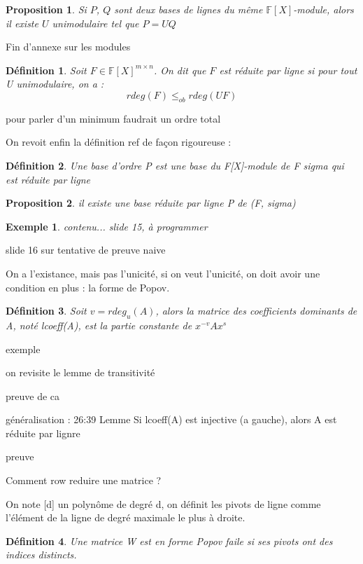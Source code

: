 \documentclass[a4paper,12pt]{report}  %
\theoremstyle{definitionstyle}
\newtheorem{definition}{Définition}[chapter] %
\theoremstyle{examplestyle}
\newtheorem{example}{Exemple}[chapter] %
\theoremstyle{remarkstyle}
\theoremstyle{propositionstyle}
\newtheorem{proposition}{Proposition}[chapter]  %
\theoremstyle{theoremstyle}
\theoremstyle{proofstyle}
\begin{document}
\begin{proposition}
	Si $P$, $Q$ sont deux bases de lignes du même $\mathbb{F}[X]$-module, alors il existe $U$ unimodulaire tel que $P = UQ$
\end{proposition}
	

Fin d'annexe sur les modules

\begin{definition}
	Soit $F \in \mathbb{F}[X]^{m \times n}$. On dit que $F$ est réduite par ligne si pour tout U unimodulaire, on a :
	$$rdeg(F) \leq_{ob} rdeg(UF)$$
\end{definition}
pour parler d'un minimum faudrait un ordre total

On revoit enfin la définition ref de façon rigoureuse : 
\begin{definition}
	Une base d'ordre P est une base du F[X]-module de F sigma qui est réduite par ligne	
\end{definition}
	
\begin{proposition}
	il existe une base réduite par ligne P de (F, sigma)
\end{proposition}
	
\begin{example}
	contenu... slide 15, à programmer
\end{example}
	
slide 16 sur tentative de preuve naive

On a l'existance, mais pas l'unicité, si on veut l'unicité, on doit avoir une condition en plus : la forme de Popov.
	
\begin{definition}
	Soit $v = rdeg_u(A)$, alors la matrice des coefficients dominants de A, noté lcoeff(A), est la partie constante de $x^{-v}Ax^s$
\end{definition}

	
	exemple
	
	on revisite le lemme de transitivité
	
	preuve de ca
	
	
	généralisation : 26:39
	Lemme
	Si lcoeff(A) est injective (a gauche), alors A est réduite par lignre
	
	preuve
	
	Comment row reduire une matrice ?
	
On note [d] un polynôme de degré d, on définit les pivots de ligne comme l'élément de la ligne de degré maximale le plus à droite.

\begin{definition}
	Une matrice W est en forme Popov faile si ses pivots ont des indices distincts.
\end{definition}
\end{document}
